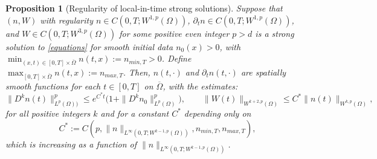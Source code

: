 \documentclass[12pt]{article}
\theoremstyle{plain}
\newtheorem{proposition}{Proposition}[section]
\begin{document}
\begin{proposition}[Regularity of local-in-time strong solutions]\label{regularity}
Suppose that $(n, W)$ with regularity $n \in C(0, T; W^{1, p}(\Omega))$, $\partial_{t}n \in C(0, T; W^{1, p}(\Omega))$, and $W \in C(0, T; W^{3, p}(\Omega))$ for some positive even integer $p > d$ is a strong solution to \eqref{equations} for smooth initial data $n_{0}(x) > 0$, with $\min_{(x, t) \in [0, T] \times \overline{\Omega}} n(t, x) := n_{min, T} > 0$. Define $\max_{[0, T] \times \overline{\Omega}} n(t, x) := n_{max, T}$. Then, $n(t, \cdot)$ and $\partial_{t}n(t, \cdot)$ are spatially smooth functions for each $t \in [0, T]$ on $\overline{\Omega}$, with the estimates:
\begin{equation*}
\|D^{k}n(t)\|_{L^{p}(\Omega))}^{p} \le e^{C^{*}t}\Big(1 + \|D^{k}n_{0}\|_{L^{p}(\Omega)}^{p}\Big), \qquad \|W(t)\|_{W^{k + 2, p}(\Omega)} \le C^{*}\|n(t)\|_{W^{k, p}(\Omega)},
\end{equation*}
for all positive integers $k$ and for a constant $C^{*}$ depending only on $$C^{*} := C(p, \|n\|_{L^{\infty}(0, T; W^{k - 1, p}(\Omega))}, n_{min, T}, n_{max, T}),$$ which is increasing as a function of $\|n\|_{L^{\infty}(0, T; W^{k - 1, p}(\Omega))}$.
\end{proposition}
\end{document}
